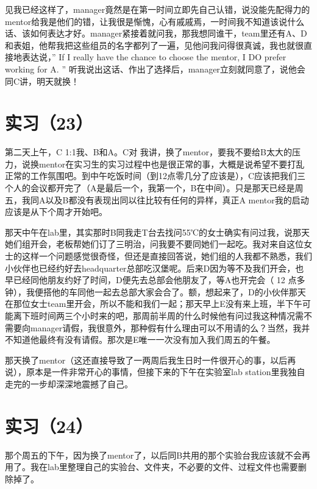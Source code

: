 \documentclass[12pt]{book}
\begin{document}
见我已经这样了，manager竟然是在第一时间立即先自己认错，说没能先配得力的mentor给我是他们的错，让我很是惭愧，心有戚戚焉，一时间我不知道该说什么话、该如何表达才好。manager紧接着就问我，那我想同谁干，team里还有A、D和表姐，他帮我把这些组员的名字都列了一遍，见他问我问得很真诚，我也就很直接地表达说，” If I really have the chance to choose the mentor, I DO prefer working for A. ” 听我说出这话、作出了选择后，manager立刻就同意了，说他会同C讲，明天就换！

\section{实习（23）}
\label{sec-5-26}

第二天上午，C 1:1我、B和A。C对 我讲，换了mentor，要我不要给B太大的压力，说换mentor在实习生的实习过程中也是很正常的事，大概是说希望不要打乱正常的工作氛围吧。到中午吃饭时间（到12点零几分了应该是），C应该把我们三个人的会议都开完了（A是最后一个，我第一个，B在中间）。只是那天已经是周五，我同A以及B都没有表现出同以往比较有任何的异样，真正A mentor我的启动应该是从下个周才开始吧。

那天中午在lab里，其实那时B同我走T台去找问55℃的女士确实有问过我，说那天她们组开会，老板帮她们订了三明治，问我要不要同她们一起吃。我对来自这位女士的这样一个问题感觉很奇怪，但还是直接回答说，她们组的人我都不熟悉，我们小伙伴也已经约好去headquarter总部吃汉堡呢。后来D因为等不及我们开会，也早已经同他朋友约好了时间，D便先去总部会他朋友了，等A也开完会（ 12 点多钟），我便搭他的车同他一起去总部大家会合了。额，想起来了，D的小伙伴那天在那位女士team里开会，所以不能和我们一起；那天早上E没有来上班，半下午可能离下班时间两三个小时来的吧，那周前半周的什么时候他有问过我这种情况需不需要向manager请假，我很意外，那种假有什么理由可以不用请的么？当然，我并不知道他最终有没有请假。那次是E唯一一次没有加入我们周五的午餐。

那天换了mentor（这还直接导致了一两周后我生日时一件很开心的事，以后再说），原本是一件非常开心的事情，但接下来的下午在实验室lab station里我独自走完的一步却深深地震撼了自己。

\section{实习（24）}
\label{sec-5-27}

那个周五的下午，因为换了mentor了，以后同B共用的那个实验台我应该就不会再用了。我在lab里整理自己的实验台、文件夹，不必要的文件、过程文件也需要删除掉了。
\end{document}
